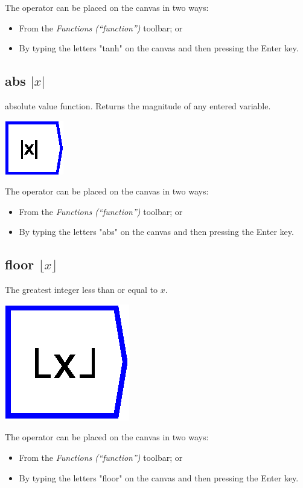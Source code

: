 The operator can be placed on the canvas in two ways:
\begin{itemize}
\item From the \emph{Functions (``function'')} toolbar; or 
\item By typing the letters "tanh" on the canvas and then pressing the
Enter key.
\end{itemize}

\subsection{abs $|x|$}

\label{Operation:abs} absolute value function. Returns the magnitude
of any entered variable.

\includegraphics{images/abs}

The operator can be placed on the canvas in two ways:
\begin{itemize}
\item From the \emph{Functions (``function'')} toolbar; or 
\item By typing the letters "abs" on the canvas and then pressing the
Enter key.
\end{itemize}

\subsection{floor $\lfloor x\rfloor$}

\label{Operation:floor} The greatest integer less than or equal to
$x$. 

\includegraphics{images/floor}

The operator can be placed on the canvas in two ways:
\begin{itemize}
\item From the \emph{Functions (``function'')} toolbar; or 
\item By typing the letters "floor" on the canvas and then pressing the
Enter key.
\end{itemize}

